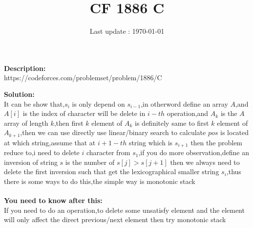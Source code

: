 \documentclass{article}
\begin{document}
\title{\textbf{CF 1886 C}}
\author{}
\date{Last update : \today}

\maketitle

\noindent \textbf{Description:}\\
https://codeforces.com/problemset/problem/1886/C

\noindent \textbf{Solution:}\\
It can be show that,$s_{i}$ is only depend on $s_{i-1}$,in otherword define an array $A$,and $A[i]$ is the index of character will be delete in $i-th$ operation,and $A_k$ is the $A$ array of length $k$,then first $k$ element of $A_k$ is definitely same to first $k$ element of $A_{k+1}$,then we can use directly use linear/binary search to calculate $pos$ is located at which string,assume that at $i+1-th$ string which is $s_{i+1}$ then the problem reduce to,i need to delete $i$ character from $s_1$,if you do more observation,define an inversion of string $s$ is the number of $s[j]>s[j+1]$ then we always need to delete the first inversion such that get the lexicographical smaller string $s_i$,thus there is some ways to do this,the simple way is monotonic stack\\
\\
\noindent \textbf{You need to know after this:}\\
If you need to do an operation,to delete some unsatisfy element and the element will only affect the direct previous/next element then try monotonic stack
\end{document}

